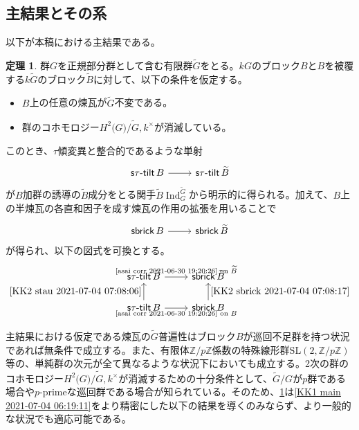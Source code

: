 \documentclass[a4paper,uplatex,dvipdfmx]{jsarticle}
\theoremstyle{definition}
\newtheorem{theorem}{定理}[section]
\newcommand{\induc}{{\operatorname{Ind}\nolimits}}
\newcommand{\stautilt}{\operatorname{\mathsf{s\tau-tilt}}}
\newcommand{\sbrick}{\operatorname{\mathsf{sbrick}}}
\begin{document}
\subsection{主結果とその系}
以下が本稿における主結果である。
\begin{theorem}\label{KK2 main 2021-07-04 07:20:14}
  群\(G\)を正規部分群として含む有限群\(\widetilde{G}\)をとる。\(kG\)のブロック\(B\)と\(B\)を被覆する\(k\widetilde{G}\)のブロック\(\widetilde{B}\)に対して、以下の条件を仮定する。
  \begin{itemize}
    \item \(B\)上の任意の煉瓦が\(\widetilde{G}\)不変である。
    \item 群のコホモロジー\(H^2(\widetilde{G)/G,k^\times}\)が消滅している。
  \end{itemize}
  このとき、\(\tau\)傾変異と整合的であるような単射
  \begin{equation}\label{KK2 stau 2021-07-04 07:08:06}
    \begin{tikzcd}
      \stautilt B\ar[r]&\stautilt \widetilde{B}
    \end{tikzcd}
  \end{equation}
  が\(B\)加群の誘導の\(\widetilde{B}\)成分をとる関手\(\widetilde{B}\induc_G^{\widetilde{G}}\)から明示的に得られる。加えて、\(B\)上の半煉瓦の各直和因子を成す煉瓦の作用の拡張を用いることで
  \begin{equation}\label{KK2 sbrick 2021-07-04 07:08:17}
    \begin{tikzcd}
      \sbrick B\ar[r]&\sbrick \widetilde{B}
    \end{tikzcd}
  \end{equation}
  が得られ、以下の図式を可換とする。
  \begin{equation}
    \begin{tikzcd}
      \stautilt \widetilde{B}\ar[r,"\text{\cref{asai corr 2021-06-30 19:20:26} on \(\widetilde{B}\)}"]&\sbrick \widetilde{B}\\
      \stautilt B\ar[u,"\cref{KK2 stau 2021-07-04 07:08:06}"]\ar[r,"\text{\cref{asai corr 2021-06-30 19:20:26} on \(B\)}"']&\sbrick B\ar[u,"\cref{KK2 sbrick 2021-07-04 07:08:17}"']
    \end{tikzcd}
  \end{equation}
\end{theorem}
主結果における仮定である煉瓦の\(\widetilde{G}\)普遍性はブロック\(B\)が巡回不足群を持つ状況であれば無条件で成立する。また、有限体\(\mathbb{Z}/p\mathbb{Z}\)係数の特殊線形群\(\mathrm{SL}(2,\mathbb{Z}/p\mathbb{Z})\)等の、単純群の次元が全て異なるような状況下においても成立する。2次の群のコホモロジー\(H^2(\widetilde{G)/G,k^\times}\)が消滅するための十分条件として、\(\widetilde{G}/G\)が\(p\)群である場合や\(p\)-primeな巡回群である場合が知られている。そのため、\cref{KK2 main 2021-07-04 07:20:14}は\cref{KK1 main 2021-07-04 06:19:11}をより精密にした以下の結果を導くのみならず、より一般的な状況でも適応可能である。
\end{document}
